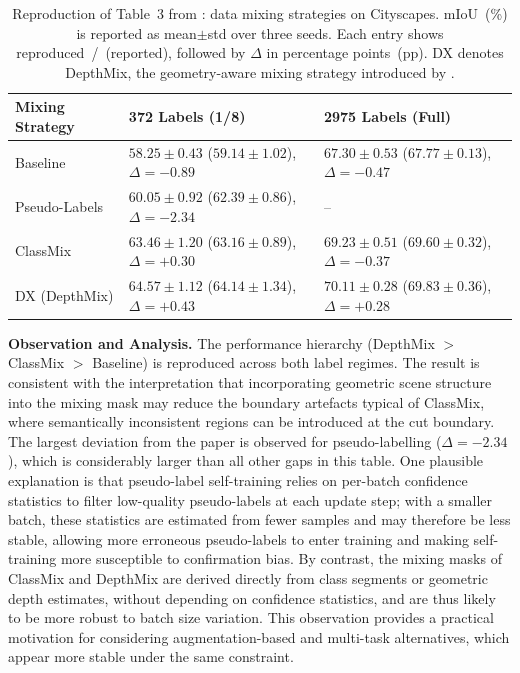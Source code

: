 \begin{table}[H]
\centering
\caption{Reproduction of Table~3 from \cite{hoyer2023improving}: data
mixing strategies on Cityscapes. mIoU~(\%) is reported as mean$\pm$std
over three seeds. Each entry shows reproduced~/~{\scriptsize (reported)},
followed by $\Delta$ in percentage points~(pp). DX denotes DepthMix, the
geometry-aware mixing strategy introduced by \cite{hoyer2023improving}.}
\label{tab:table3_repro}
\renewcommand{\arraystretch}{1.2}
\begin{tabularx}{\textwidth}{lXX}
\toprule
\textbf{Mixing Strategy} &
\textbf{372 Labels (1/8)} &
\textbf{2975 Labels (Full)} \\
\midrule
Baseline &
$58.25 \pm 0.43$ {\scriptsize ($59.14 \pm 1.02$), $\Delta=-0.89$} &
$67.30 \pm 0.53$ {\scriptsize ($67.77 \pm 0.13$), $\Delta=-0.47$} \\
Pseudo-Labels &
$60.05 \pm 0.92$ {\scriptsize ($62.39 \pm 0.86$), $\Delta=-2.34$} &
-- \\
ClassMix &
$63.46 \pm 1.20$ {\scriptsize ($63.16 \pm 0.89$), $\Delta=+0.30$} &
$69.23 \pm 0.51$ {\scriptsize ($69.60 \pm 0.32$), $\Delta=-0.37$} \\
DX (DepthMix) &
$64.57 \pm 1.12$ {\scriptsize ($64.14 \pm 1.34$), $\Delta=+0.43$} &
$70.11 \pm 0.28$ {\scriptsize ($69.83 \pm 0.36$), $\Delta=+0.28$} \\
\bottomrule
\end{tabularx}
\end{table}

\noindent
\textbf{Observation and Analysis.}
The performance hierarchy (DepthMix $>$ ClassMix $>$ Baseline) is
reproduced across both label regimes. The result is consistent with the
interpretation that incorporating geometric scene structure into the
mixing mask may reduce the boundary artefacts typical of ClassMix, where
semantically inconsistent regions can be introduced at the cut boundary.
The largest deviation from the paper is observed for pseudo-labelling
($\Delta = -2.34$), which is considerably larger than all other gaps in
this table. One plausible explanation is that pseudo-label self-training
relies on per-batch confidence statistics to filter low-quality
pseudo-labels at each update step; with a smaller batch, these statistics
are estimated from fewer samples and may therefore be less stable,
allowing more erroneous pseudo-labels to enter training and making
self-training more susceptible to confirmation bias. By contrast, the
mixing masks of ClassMix and DepthMix are derived directly from class
segments or geometric depth estimates, without depending on confidence
statistics, and are thus likely to be more robust to batch size variation.
This observation provides a practical motivation for considering
augmentation-based and multi-task alternatives, which appear more stable
under the same constraint.

